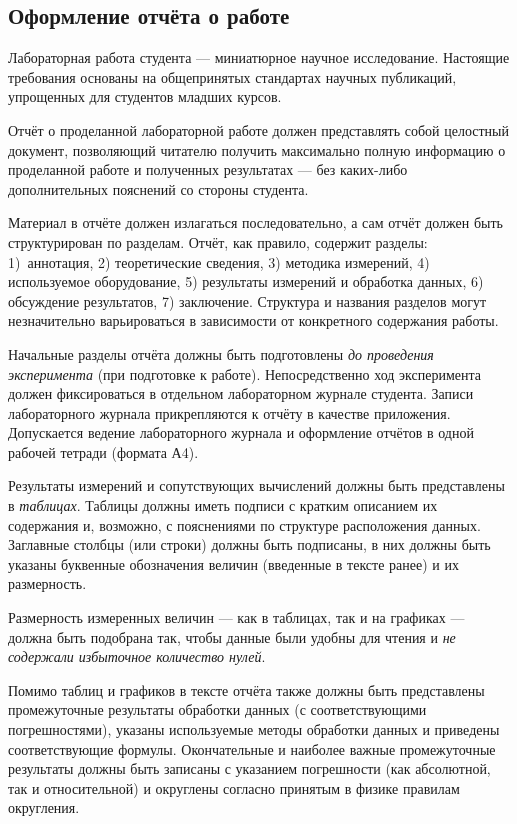 \documentclass[10pt]{article}
\begin{document}
\subsection{Оформление отчёта о работе}

Лабораторная работа студента --- миниатюрное научное исследование.
Настоящие требования основаны на общепринятых стандартах научных публикаций,
упрощенных для студентов младших курсов.

Отчёт о проделанной лабораторной работе должен представлять собой
целостный документ, позволяющий читателю получить максимально полную
информацию о проделанной работе и полученных результатах ---
без каких-либо дополнительных пояснений со стороны студента.

Материал в отчёте должен излагаться последовательно, а сам отчёт должен
быть структурирован по разделам. Отчёт, как правило, содержит разделы:
1) аннотация, 2) теоретические сведения, 3) методика измерений, 4)
используемое оборудование, 5) результаты измерений и обработка данных,
6) обсуждение результатов, 7) заключение. Структура и названия разделов
могут незначительно варьироваться в зависимости от конкретного содержания
работы.

Начальные разделы отчёта должны быть подготовлены \emph{до проведения
эксперимента} (при подготовке к работе). Непосредственно ход эксперимента
должен фиксироваться в отдельном лабораторном журнале студента. Записи
лабораторного журнала прикрепляются к отчёту в качестве приложения.
Допускается ведение лабораторного журнала и оформление отчётов в одной
рабочей тетради (формата А4).

Результаты измерений и сопутствующих вычислений должны быть представлены
в \emph{таблицах}. Таблицы должны иметь подписи с кратким описанием
их содержания и, возможно, с пояснениями по структуре расположения
данных. Заглавные столбцы (или строки) должны быть подписаны, в них
должны быть указаны буквенные обозначения величин (введенные в тексте
ранее) и их размерность. 

Размерность измеренных величин --- как в таблицах, так и
на графиках --- должна быть подобрана так, чтобы данные
были удобны для чтения и \emph{не содержали избыточное количество
нулей}.

Помимо таблиц и графиков в тексте отчёта также должны быть представлены
промежуточные результаты обработки данных (с соответствующими погрешностями),
указаны используемые методы обработки данных и приведены соответствующие
формулы. Окончательные и наиболее важные промежуточные результаты
должны быть записаны с указанием погрешности (как абсолютной, так
и относительной) и округлены согласно принятым в физике правилам округления.
\end{document}
